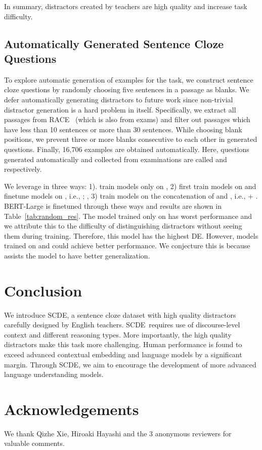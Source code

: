 \documentclass[11pt,a4paper]{article}
\newcommand{\dsname}{\textsc{SCDE}}
\begin{document}
In summary, distractors created by teachers are high quality and increase task difficulty. 
\subsection{Automatically Generated Sentence Cloze Questions}
\label{subsec:qa}
To explore automatic generation of examples for the task, we construct sentence cloze questions by randomly choosing five sentences in a passage as blanks. We defer automatically generating distractors to future work since non-trivial distractor generation is a hard problem in itself. Specifically, we extract all passages from RACE~\cite{lai2017race} (which is also from exams) and filter out passages which have less than 10 sentences or more than 30 sentences. While choosing blank positions, we prevent three or more blanks consecutive to each other in generated questions. Finally, 16,706 examples are obtained automatically. Here, questions generated automatically and collected from examinations are called  and  respectively.

We leverage  in three ways: 1). train models only on  , 2) first train models on  and finetune models on , i.e.,  ; , 3) train models on the concatenation of  and , i.e.,  + . BERT-Large is finetuned through these ways and results are shown in Table~\ref{tab:random_res}. The model trained only on  has worst performance and we attribute this to the difficulty of distinguishing distractors without seeing them during training. Therefore, this model has the highest DE. However, models trained on  and  could achieve better performance. We conjecture this is because  assists the model to have better generalization. 

 

\section{Conclusion}
\label{sec:conclusions}
We introduce \dsname, a sentence cloze dataset with high quality distractors carefully designed by English teachers. \dsname~requires use of discourse-level context and different reasoning types. More importantly, the high quality distractors make this task more challenging. Human performance is found to exceed advanced contextual embedding and language models by a significant margin. Through \dsname, we aim to encourage the development of more advanced language understanding models.
 \section{Acknowledgements}
We thank Qizhe Xie, Hiroaki Hayashi and the 3 anonymous reviewers for valuable comments.
\newpage


\clearpage
\newpage
\end{document}
